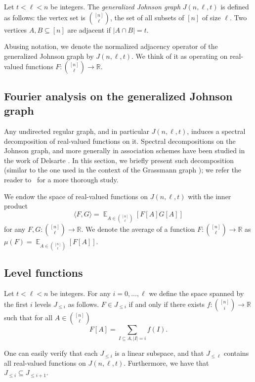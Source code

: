 \documentclass{toc}
\newcommand\card[1]{\left| {#1} \right|}
\newcommand\Expect[2]{{\mathop{\mathbb{E}}_{#1}\left[ {#2} \right]}}
\newcommand\inner[2]{\langle{#1},{#2}\rangle}
\renewcommand\leq{\leqslant}
\begin{document}
%
%
%

%
%

\begin{definition}
Let $t<\ell<n$ be integers. The
\emph{generalized Johnson graph}  %
 $J(n,\ell,t)$ is defined as follows:
the vertex set is ${[n] \choose \ell}$, the set of all subsets of $[n]$ of size $\ell$.
Two vertices $A,B\subseteq [n]$ are %
adjacent  %
if %
%
$\card{A\cap B} = t$.
\end{definition}

Abusing notation, we denote the normalized adjacency operator of the generalized
Johnson graph by $J(n,\ell,t)$.  We think of it as operating on
%
real-valued  %
functions
$F\colon {[n] \choose \ell}\to\mathbb{R}$.

\subsection{Fourier analysis on the generalized Johnson graph}
Any undirected regular graph, %
and in particular $J(n,\ell,t)$, %
induces a spectral decomposition of
real-valued functions on it.
Spectral decompositions on the Johnson graph, and more generally in association schemes have been studied in the %
work  %
of Delsarte \cite{Delsarte,Delsarte2}. In this section, we briefly present such decomposition (similar to the one
used in the context of the Grassmann graph \cite{DKKMSgras}); we refer the reader to~\cite{Godsil} for a more thorough study.

%
%
%
We endow the space of real-valued functions on $J(n,\ell,t)$ with the inner product
\[
\inner{F}{G} = \Expect{A\in {[n] \choose \ell}}{F[A]G[A]}
\]
for any $F,G\colon {[n] \choose \ell}\to\mathbb{R}$.
We denote the average of a function $F\colon {[n] \choose \ell}\to\mathbb{R}$ as $\mu(F) = \Expect{A\in{[n]\choose \ell}}{F[A]}$.

\subsection{Level functions}
\begin{definition}
Let $t<\ell<n$ be integers. For any $i=0,...,\ell$ we define the space spanned by the
first $i$ levels $J_{\leq i}$ as follows. $F\in J_{\leq i}$ if and only if there exists
$f\colon {[n] \choose i}\to \mathbb{R}$ such that for all $A\in\binom{[n]}{\ell}$
\[
F[A] = \sum\limits_{I\subseteq A, \card{I} = i}{f(I)}.
\]
%
%
%
\end{definition}
One can easily verify that each $J_{\leq i}$ is a linear subspace, and that
$J_{\leq \ell}$ contains all real-valued functions on $J(n,\ell,t)$. Furthermore, we have that
$J_{\leq i}\subseteq J_{\leq i+1}$.
\end{document}
